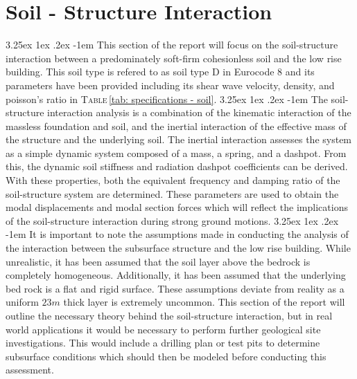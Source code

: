 \documentclass[11pt,a4paper,titlepage]{report}
\makeatletter
\renewcommand\paragraph{\@startsection{paragraph}{5}{\z@}%
  {3.25ex \@plus1ex \@minus.2ex}%
  {-1em}%
  {\normalfont\normalsize\bfseries}}
\makeatother
\begin{document}
\chapter{Soil - Structure Interaction}
\paragraph{}This section of the report will focus on the soil-structure interaction between a predominately soft-firm cohesionless soil and the low rise building. This soil type is refered to as soil type D in Eurocode 8 and its parameters have been provided including its shear wave velocity, density, and poisson's ratio in \textsc{Table}\,\ref{tab: specifications - soil}. 
\paragraph{}The soil-structure interaction analysis is a combination of the kinematic interaction of the massless foundation and soil, and the inertial interaction of the effective mass of the structure and the underlying soil. The inertial interaction assesses the system as a simple dynamic system composed of a mass, a spring, and a dashpot. From this, the dynamic soil stiffness and radiation dashpot coefficients can be derived. With these properties, both the equivalent frequency and damping ratio of the soil-structure system are determined. These parameters are used to obtain the modal displacements and modal section forces which will reflect the implications of the soil-structure interaction during strong ground motions.
\paragraph{}It is important to note the assumptions made in conducting the analysis of the interaction between the subsurface structure and the low rise building. While unrealistic, it has been assumed that the soil layer above the bedrock is completely homogeneous. Additionally, it has been assumed that the underlying bed rock is a flat and rigid surface. These assumptions deviate from reality as a uniform $23m$ thick layer is extremely uncommon. This section of the report will outline the necessary theory behind the soil-structure interaction, but in real world applications it would be necessary to perform further geological site investigations. This would include a drilling plan or test pits to determine subsurface conditions which should then be modeled before conducting this assessment. 
\end{document}
